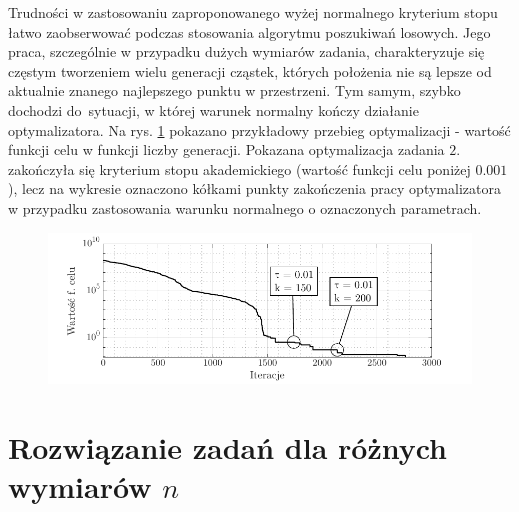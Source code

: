 \documentclass[11pt, a4paper, oneside]{article}
\begin{document}
Trudności w zastosowaniu zaproponowanego wyżej normalnego kryterium stopu łatwo zaobserwować podczas stosowania algorytmu poszukiwań losowych. Jego praca, szczególnie w przypadku dużych wymiarów zadania, charakteryzuje się częstym tworzeniem wielu generacji cząstek, których położenia nie są lepsze od aktualnie znanego najlepszego punktu w przestrzeni. Tym samym, szybko dochodzi do~sytuacji, w której warunek normalny kończy działanie optymalizatora. Na rys. \ref{fig:warunek:mc} pokazano przykładowy przebieg optymalizacji - wartość funkcji celu w funkcji liczby generacji. Pokazana optymalizacja zadania $2$. zakończyła się kryterium stopu akademickiego (wartość funkcji celu poniżej $0.001$), lecz na wykresie oznaczono kółkami punkty zakończenia pracy optymalizatora w przypadku zastosowania warunku normalnego o oznaczonych parametrach.

\begin{figure}[h]
\centerline{\includegraphics[width=\dimexpr.9\textwidth-1em]{grafiki/warunek_stopu.pdf}}
\label{fig:warunek:mc}
\end{figure}

\section{Rozwiązanie zadań dla różnych wymiarów $n$}
\end{document}
